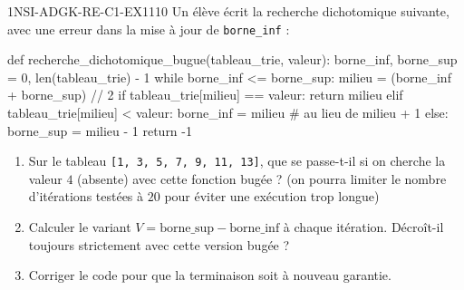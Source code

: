 

\begin{exercice}{1NSI-ADGK-RE-C1-EX1}{1}{10}
Un élève écrit la recherche dichotomique suivante, avec une erreur dans la mise à jour de
\lstinline{borne_inf} :
\begin{python}
def recherche_dichotomique_bugue(tableau_trie, valeur):
    borne_inf, borne_sup = 0, len(tableau_trie) - 1
    while borne_inf <= borne_sup:
        milieu = (borne_inf + borne_sup) // 2
        if tableau_trie[milieu] == valeur:
            return milieu
        elif tableau_trie[milieu] < valeur:
            borne_inf = milieu  # au lieu de milieu + 1
        else:
            borne_sup = milieu - 1
    return -1
\end{python}
\begin{enumerate}
  \item Sur le tableau \lstinline{[1, 3, 5, 7, 9, 11, 13]}, que se passe-t-il si on cherche la valeur $4$ (absente) avec cette fonction bugée ? (on pourra limiter le nombre d'itérations testées à $20$ pour éviter une exécution trop longue)
  \item Calculer le variant $V=\text{borne\_sup}-\text{borne\_inf}$ à chaque itération. Décroît-il toujours strictement avec cette version bugée ?
  \item Corriger le code pour que la terminaison soit à nouveau garantie.
\end{enumerate}
\end{exercice}

